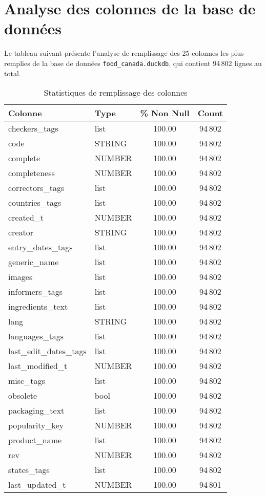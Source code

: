 \documentclass{article}
\begin{document}
\section{Analyse des colonnes de la base de données}

Le tableau suivant présente l'analyse de remplissage des 25 colonnes les plus remplies de la base de données \texttt{food_canada.duckdb}, qui contient 94\,802 lignes au total.

\begin{table}[htbp]
\centering
\begin{tabular}{@{}p{4.5cm}p{2cm}S[table-format=3.2]S[table-format=6.0]@{}}
\toprule
\textbf{Colonne} & \textbf{Type} & {\textbf{\% Non Null}} & {\textbf{Count}} \\
\midrule
checkers\_tags & list & 100.00 & 94\,802 \\
code & STRING & 100.00 & 94\,802 \\
complete & NUMBER & 100.00 & 94\,802 \\
completeness & NUMBER & 100.00 & 94\,802 \\
correctors\_tags & list & 100.00 & 94\,802 \\
countries\_tags & list & 100.00 & 94\,802 \\
created\_t & NUMBER & 100.00 & 94\,802 \\
creator & STRING & 100.00 & 94\,802 \\
entry\_dates\_tags & list & 100.00 & 94\,802 \\
generic\_name & list & 100.00 & 94\,802 \\
images & list & 100.00 & 94\,802 \\
informers\_tags & list & 100.00 & 94\,802 \\
ingredients\_text & list & 100.00 & 94\,802 \\
lang & STRING & 100.00 & 94\,802 \\
languages\_tags & list & 100.00 & 94\,802 \\
last\_edit\_dates\_tags & list & 100.00 & 94\,802 \\
last\_modified\_t & NUMBER & 100.00 & 94\,802 \\
misc\_tags & list & 100.00 & 94\,802 \\
obsolete & bool & 100.00 & 94\,802 \\
packaging\_text & list & 100.00 & 94\,802 \\
popularity\_key & NUMBER & 100.00 & 94\,802 \\
product\_name & list & 100.00 & 94\,802 \\
rev & NUMBER & 100.00 & 94\,802 \\
states\_tags & list & 100.00 & 94\,802 \\
last\_updated\_t & NUMBER & 100.00 & 94\,801 \\
\bottomrule
\end{tabular}
\caption{Statistiques de remplissage des colonnes}
\end{table}
\end{document}
